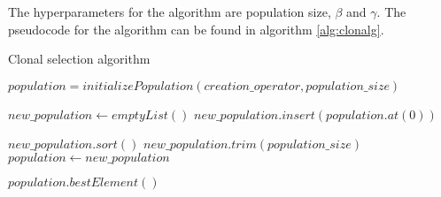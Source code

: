 The hyperparameters for the algorithm are population size, $\beta$ and $\gamma$. The pseudocode for the algorithm can be found in algorithm \ref{alg:clonalg}.

\begin{algorithm}[!htbp]
    \caption{Clonal selection algorithm}
    \label{alg:clonalg}

    $population = initializePopulation(creation\_operator, population\_size)$\;

     {

        $new\_population \gets emptyList()$\;
        $new\_population.insert(population.at(0))$\;


        $new\_population.sort()$\;
        $new\_population.trim(population\_size)$\;
        $population \gets new\_population$\;
    }

    \Return $population.bestElement()$\;
    \end{algorithm}
